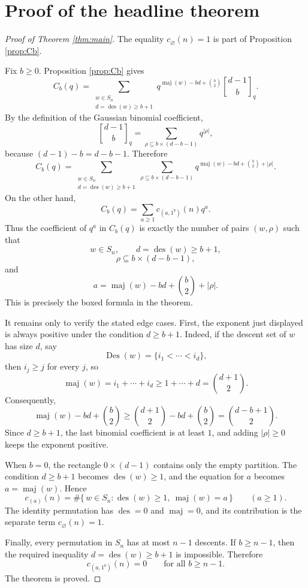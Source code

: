 \documentclass[12pt]{article}
\DeclareMathOperator{\Des}{Des}
\DeclareMathOperator{\des}{des}
\DeclareMathOperator{\maj}{maj}
\newcommand{\qbinom}[2]{\genfrac{[}{]}{0pt}{}{#1}{#2}_q}
\begin{document}
\section{Proof of the headline theorem}

\begin{proof}[Proof of Theorem \ref{thm:main}]
The equality \(c_{\varnothing}(n)=1\) is part of Proposition \ref{prop:Cb}.

Fix \(b\ge 0\).  Proposition \ref{prop:Cb} gives
\[
C_b(q)
=
\sum_{\substack{w\in S_n\\ d=\des(w)\ge b+1}}
q^{\maj(w)-bd+\binom{b}{2}}
\qbinom{d-1}{b}.
\]
By the definition of the Gaussian binomial coefficient,
\[
\qbinom{d-1}{b}
=
\sum_{\rho\subseteq b\times(d-b-1)}q^{|\rho|},
\]
because \((d-1)-b=d-b-1\).  Therefore
\[
C_b(q)
=
\sum_{\substack{w\in S_n\\ d=\des(w)\ge b+1}}
\sum_{\rho\subseteq b\times(d-b-1)}
q^{\maj(w)-bd+\binom{b}{2}+|\rho|}.
\]
On the other hand,
\[
C_b(q)=\sum_{a\ge 1}c_{(a,1^b)}(n)q^a.
\]
Thus the coefficient of \(q^a\) in \(C_b(q)\) is exactly the number of pairs \((w,\rho)\) such that
\[
w\in S_n,\qquad d=\des(w)\ge b+1,
\]
\[
\rho\subseteq b\times(d-b-1),
\]
and
\[
a=\maj(w)-bd+\binom{b}{2}+|\rho|.
\]
This is precisely the boxed formula in the theorem.

It remains only to verify the stated edge cases.  First, the exponent just displayed is always positive under the condition \(d\ge b+1\).  Indeed, if the descent set of \(w\) has size \(d\), say
\[
\Des(w)=\{i_1<\cdots<i_d\},
\]
then \(i_j\ge j\) for every \(j\), so
\[
\maj(w)=i_1+\cdots+i_d\ge 1+\cdots+d=\binom{d+1}{2}.
\]
Consequently,
\[
\maj(w)-bd+\binom{b}{2}
\ge
\binom{d+1}{2}-bd+\binom{b}{2}
=
\binom{d-b+1}{2}.
\]
Since \(d\ge b+1\), the last binomial coefficient is at least \(1\), and adding \(|\rho|\ge 0\) keeps the exponent positive.

When \(b=0\), the rectangle \(0\times(d-1)\) contains only the empty partition.  The condition \(d\ge b+1\) becomes \(\des(w)\ge 1\), and the equation for \(a\) becomes \(a=\maj(w)\).  Hence
\[
c_{(a)}(n)
=
\#\{\,w\in S_n:\des(w)\ge 1,\ \maj(w)=a\,\}
\qquad (a\ge 1).
\]
The identity permutation has \(\des=0\) and \(\maj=0\), and its contribution is the separate term \(c_{\varnothing}(n)=1\).

Finally, every permutation in \(S_n\) has at most \(n-1\) descents.  If \(b\ge n-1\), then the required inequality \(d=\des(w)\ge b+1\) is impossible.  Therefore
\[
c_{(a,1^b)}(n)=0
\qquad\text{for all }b\ge n-1.
\]
The theorem is proved.
\end{proof}
\end{document}
